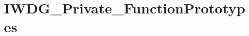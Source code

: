 \hypertarget{group___i_w_d_g___private___function_prototypes}{\section{I\-W\-D\-G\-\_\-\-Private\-\_\-\-Function\-Prototypes}
\label{group___i_w_d_g___private___function_prototypes}
}
